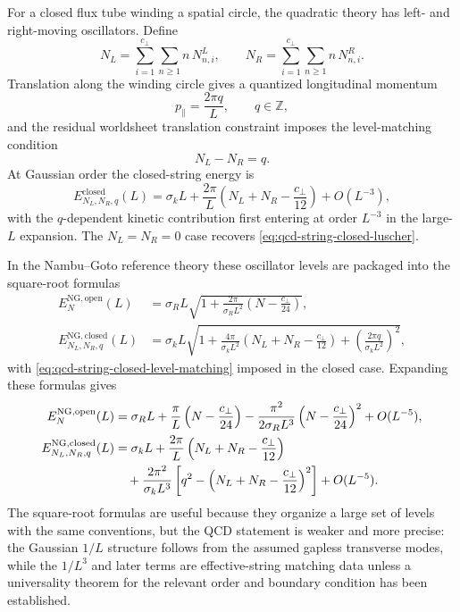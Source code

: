 For a closed flux tube winding a spatial circle, the quadratic theory has
left- and right-moving oscillators.  Define
\[
  N_L=\sum_{i=1}^{c_\perp}\sum_{n\ge1}n\,N^L_{n,i},
  \qquad
  N_R=\sum_{i=1}^{c_\perp}\sum_{n\ge1}n\,N^R_{n,i}.
\]
Translation along the winding circle gives a quantized longitudinal momentum
\[
  p_\parallel=\frac{2\pi q}{L},
  \qquad q\in\mathbb Z,
\]
and the residual worldsheet translation constraint imposes the level-matching
condition
\begin{equation}
  N_L-N_R=q .
  \label{eq:qcd-string-closed-level-matching}
\end{equation}
At Gaussian order the closed-string energy is
\begin{equation}
  E_{N_L,N_R,q}^{\mathrm{closed}}(L)
  =
  \sigma_kL
  +
  \frac{2\pi}{L}
  \left(
    N_L+N_R-\frac{c_\perp}{12}
  \right)
  +O(L^{-3}),
  \label{eq:qcd-string-closed-gaussian-levels}
\end{equation}
with the \(q\)-dependent kinetic contribution first entering at order
\(L^{-3}\) in the large-\(L\) expansion.  The \(N_L=N_R=0\) case recovers
\eqref{eq:qcd-string-closed-luscher}.

In the Nambu--Goto reference theory these oscillator levels are packaged into
the square-root formulas
\begin{align}
  E_N^{\mathrm{NG,open}}(L)
  &=
  \sigma_R L
  \sqrt{
    1+
    \frac{2\pi}{\sigma_RL^2}
    \left(N-\frac{c_\perp}{24}\right)
  },
  \label{eq:qcd-string-ng-open-levels}\\
  E_{N_L,N_R,q}^{\mathrm{NG,closed}}(L)
  &=
  \sigma_k L
  \sqrt{
    1+
    \frac{4\pi}{\sigma_kL^2}
    \left(N_L+N_R-\frac{c_\perp}{12}\right)
    +
    \left(\frac{2\pi q}{\sigma_kL^2}\right)^2
  },
  \label{eq:qcd-string-ng-closed-levels}
\end{align}
with \eqref{eq:qcd-string-closed-level-matching} imposed in the closed case.
Expanding these formulas gives
\begin{align}
  E_N^{\mathrm{NG,open}}(L)
  &=
  \sigma_RL
  +
  \frac{\pi}{L}
  \left(N-\frac{c_\perp}{24}\right)
  -
  \frac{\pi^2}{2\sigma_RL^3}
  \left(N-\frac{c_\perp}{24}\right)^2
  +O(L^{-5}),
  \label{eq:qcd-string-ng-open-level-expansion}\\
  E_{N_L,N_R,q}^{\mathrm{NG,closed}}(L)
  &=
  \sigma_kL
  +
  \frac{2\pi}{L}
  \left(N_L+N_R-\frac{c_\perp}{12}\right)
  \notag\\
  &\quad
  +
  \frac{2\pi^2}{\sigma_kL^3}
  \left[
    q^2-
    \left(N_L+N_R-\frac{c_\perp}{12}\right)^2
  \right]
  +O(L^{-5}).
  \label{eq:qcd-string-ng-closed-level-expansion}
\end{align}
The square-root formulas are useful because they organize a large set of
levels with the same conventions, but the QCD statement is weaker and more
precise: the Gaussian \(1/L\) structure follows from the assumed gapless
transverse modes, while the \(1/L^3\) and later terms are effective-string
matching data unless a universality theorem for the relevant order and
boundary condition has been established.

